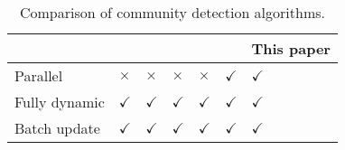 \begin{table}
\setlength{\tabcolsep}{1pt}
\centering
\begin{tabular}{|l|l|l|l|l|l|l|} \hline
 & \cite{com-zarayeneh21} & \cite{com-zhuang19} & \cite{com-chong13} &  \cite{com-xie13} & \cite{com-riedy13} & {\bf This paper} \\ \hline
Parallel & $\times$ & $\times$ & $\times$ & $\times$ & $\checkmark$ & $\checkmark$ \\ \hline
Fully dynamic & $\checkmark$ & $\checkmark$ & $\checkmark$ & $\checkmark$ & $\checkmark$ & $\checkmark$ \\ \hline
Batch update & $\checkmark$ & $\checkmark$ & $\checkmark$ & $\checkmark$ & $\checkmark$ &  $\checkmark$ \\ \hline
\end{tabular}
\caption{Comparison of community detection algorithms.}
\label{tab:comparision}
\end{table}
